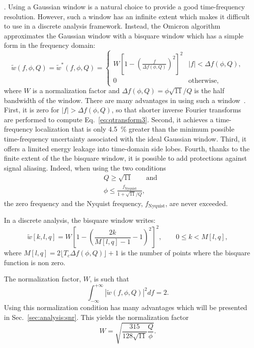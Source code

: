 . Using a Gaussian window is a natural choice to provide a good time-frequency resolution. However, such a window has an infinite extent which makes it difficult to use in a discrete analysis framework. Instead, the Omicron algorithm approximates the Gaussian window with a bisquare window which has a simple form in the frequency domain:
\begin{equation}
  \tilde{w}(f,\phi,Q) = \tilde{w}^*(f,\phi,Q) =
  \begin{cases}
    W\left[1 - \left(\frac{f}{\Delta f(\phi,Q)}\right)^2 \right]^2 & |f| < \Delta f(\phi,Q), \\
    0 & \textrm{otherwise},
  \end{cases}
  \label{eq:bisquare}
\end{equation}
where $W$ is a normalization factor and $\Delta f(\phi,Q)=\phi\sqrt{11}/Q$ is the half bandwidth of the window. There are many advantages in using such a window~\cite{Chatterji:2004}. First, it is zero for $|f| > \Delta f(\phi,Q)$, so that shorter inverse Fourier transforms are performed to compute Eq.~\ref{eq:qtransform3}. Second, it achieves a time-frequency localization that is only 4.5~\% greater than the minimum possible time-frequency uncertainty associated with the ideal Gaussian window. Third, it offers a limited energy leakage into time-domain side lobes. Fourth, thanks to the finite extent of the the bisquare window, it is possible to add protections against signal aliasing. Indeed, when using the two conditions
\begin{align}
  &Q\ge\sqrt{11} \qquad \text{and}\label{eq:antialias1} \\
  &\phi \le \frac{f_{\text{Nyquist}}}{1+\sqrt{11}/Q}, \label{eq:antialias2}
\end{align}
the zero frequency and the Nyquist frequency, $f_{\text{Nyquist}}$, are never exceeded.

In a discrete analysis, the bisquare window writes:
\begin{equation}
  \tilde{w}[k,l,q] = W \left[1 - \left(\frac{2k}{M[l,q]-1}-1\right)^2 \right]^2, \qquad 0\le k < M[l,q],
  \label{eq:dbisquare}
\end{equation}
where $M[l,q] = 2\lfloor{T_c\Delta f(\phi,Q)\rfloor} +1$ is the number of points where the bisquare function is non zero.

The normalization factor, $W$, is such that
\begin{equation}
  \int_{-\infty}^{+\infty}{|\tilde{w}(f,\phi,Q)|^2df} = 2.
  \label{eq:winnorm}
\end{equation}
Using this normalization condition has many advantages which will be presented in Sec.~\ref{sec:analysis:snr}. This yields the normalization factor
\begin{equation}
  W = \sqrt{\frac{315}{128\sqrt{11}} \frac{Q}{\phi}}.
  \label{eq:W}
\end{equation}

